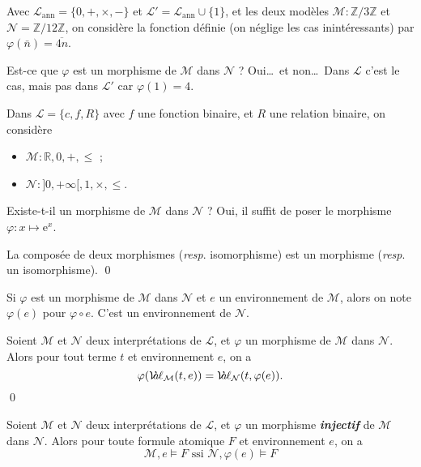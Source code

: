\documentclass[./main]{subfiles}
\begin{document}
  \begin{exm}
    Avec $\mathcal{L}_\mathrm{ann} = \{0, +, \times ,-\}$ et $\mathcal{L}' = \mathcal{L}_\mathrm{ann}\cup  \{1\}$, et les deux modèles $\mathcal{M} : \mathds{Z} / 3\mathds{Z}$ et $\mathcal{N} = \mathds{Z} / 12 \mathds{Z}$, on considère la fonction définie (on néglige les cas inintéressants) par $\varphi(\bar{n}) = \overline{4n}$.

    Est-ce que $\varphi$ est un morphisme de $\mathcal{M}$ dans $\mathcal{N}$ ? Oui\ldots\ et non\ldots\ Dans $\mathcal{L}$ c'est le cas, mais pas dans $\mathcal{L}'$  car $\varphi(1) = 4$.
  \end{exm}

  \begin{exm}
    Dans $\mathcal{L} = \{c, f, R\}$ avec $f$ une fonction binaire, et $R$ une relation binaire, on considère 
    \begin{itemize}
      \item $\mathcal{M} : \mathds{R}, 0, +, \le$ ;
      \item $\mathcal{N} : {]{0,+\infty}[}, 1, \times , \le$.
    \end{itemize}
    Existe-t-il un morphisme de $\mathcal{M}$ dans $\mathcal{N}$ ?
    Oui, il suffit de poser le morphisme $\varphi : x \mapsto \mathrm{e}^x$.
  \end{exm}

  \begin{prop}
    La composée de deux morphismes (\textit{resp}. isomorphisme) est un morphisme (\textit{resp}. un isomorphisme).
    \qed
  \end{prop}

  \begin{nota}
    Si $\varphi$ est un morphisme de $\mathcal{M}$ dans $\mathcal{N}$ et $e$ un environnement de $\mathcal{M}$,
    alors on note $\varphi(e)$ pour  $\varphi \circ e$. C'est un environnement de $\mathcal{N}$.
  \end{nota}

  \begin{lem}
    Soient $\mathcal{M}$ et $\mathcal{N}$ deux interprétations de $\mathcal{L}$, et $\varphi$ un morphisme de $\mathcal{M}$ dans $\mathcal{N}$. Alors pour tout terme $t$ et environnement $e$, on a \[
    \varphi(\mathcal{V}\hspace{-3.5pt}a\hspace{-0.5pt}\ell_\mathcal{M}(t, e)) = \mathcal{V}\hspace{-3.5pt}a\hspace{-0.5pt}\ell_\mathcal{N}(t, \varphi(e))
    .\]
    \qed
  \end{lem}

  \begin{lem}
    Soient $\mathcal{M}$ et $\mathcal{N}$ deux interprétations de $\mathcal{L}$, et $\varphi$ un morphisme \textit{\textbf{injectif}} de $\mathcal{M}$ dans $\mathcal{N}$. Alors pour toute formule atomique $F$ et environnement $e$, on a \[
      \mathcal{M}, e \models F \text{ ssi } \mathcal{N}, \varphi(e) \models F
    \]
  \end{lem}
\end{document}
